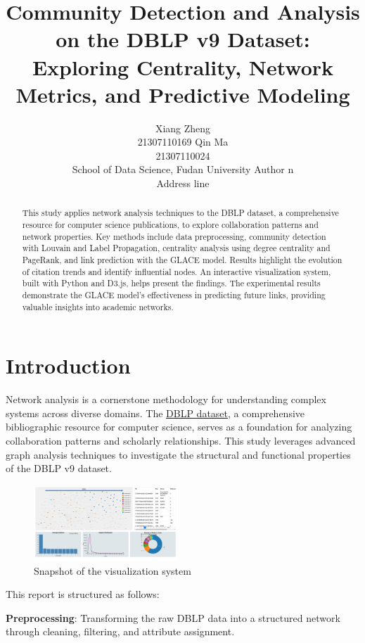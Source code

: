 \documentclass[11pt]{article}
\title{Community Detection and Analysis on the DBLP v9 Dataset: Exploring Centrality, Network Metrics, and Predictive Modeling}
\author{
    Xiang Zheng \\ 21307110169 \And  
    Qin Ma      \\ 21307110024 
    \vspace{0.2cm} \\ %
    \hfill School of Data Science, Fudan University \hfill
    \And
    Author n \\ Address line
}
\begin{document}
\maketitle
\begin{abstract}
	This study applies network analysis techniques to the DBLP dataset, a comprehensive resource for computer science publications, to explore collaboration patterns and network properties. Key methods include data preprocessing, community detection with Louvain and Label Propagation, centrality analysis using degree centrality and PageRank, and link prediction with the GLACE model. Results highlight the evolution of citation trends and identify influential nodes. An interactive visualization system, built with Python and D3.js, helps present the findings. The experimental results demonstrate the GLACE model's effectiveness in predicting future links, providing valuable insights into academic networks.
\end{abstract}

\section{Introduction}

Network analysis is a cornerstone methodology for understanding complex systems across diverse domains. The \href{https://www.aminer.cn/citation}{DBLP dataset}, a comprehensive bibliographic resource for computer science, serves as a foundation for analyzing collaboration patterns and scholarly relationships. This study leverages advanced graph analysis techniques to investigate the structural and functional properties of the DBLP v9 dataset.

\begin{figure}[ht]
	\centering
	\includegraphics[width=0.48\textwidth]{img/introduction/visualization.png}
	\caption{Snapshot of the visualization system}
	\label{fig:visualize}
\end{figure}

This report is structured as follows:

\textbf{Preprocessing}: Transforming the raw DBLP data into a structured network through cleaning, filtering, and attribute assignment.
\end{document}
